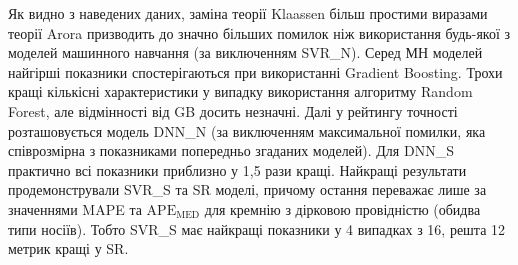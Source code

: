 \documentclass[12pt,a4paper,titlepage,oneside]{book}
\numberwithin{equation}{part}
\begin{document}
Як видно з наведених даних, заміна теорії Klaassen більш простими виразами теорії Arora
призводить до значно більших помилок ніж використання будь-якої з моделей машинного навчання
(за виключенням SVR\_N).
Серед МН моделей найгірші показники спостерігаються при використанні Gradient Boosting.
Трохи кращі кількісні характеристики у випадку використання алгоритму Random Forest,
але відмінності від GB досить незначні.
Далі у рейтингу точності розташовується модель DNN\_N (за виключенням максимальної помилки, яка співрозмірна з
показниками попередньо згаданих моделей).
Для DNN\_S практично всі показники приблизно у 1,5 рази кращі.
Найкращі результати продемонстрували SVR\_S та SR моделі, причому остання переважає
лише за значеннями MAPE та $\mathrm{APE}_\mathrm{MED}$ для кремнію з дірковою провідністю
(обидва типи носіїв).
Тобто SVR\_S має найкращі показники у 4 випадках з 16,
решта 12 метрик кращі у SR.
\end{document}
